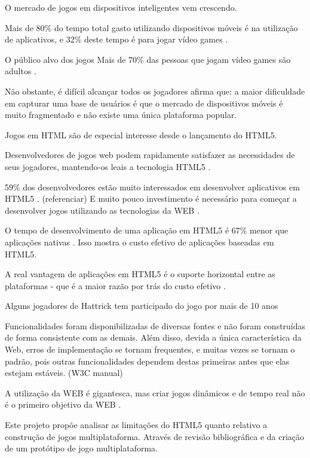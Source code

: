 
O mercado de jogos em dispositivos inteligentes vem crescendo.


Mais de 80\% do tempo total gasto utilizando dispositivos móveis é na
utilização de aplicativos, e 32\% deste tempo é para jogar vídeo
games \autocite{HTML5CrossPlatformGameDevelopment}.

O público alvo dos jogos 
Mais de 70\% das pessoas que jogam vídeo games são adultos
\autocite{gamebenefits}.

Não obstante, é difícil alcançar todos os jogadores
\cite{html5Tradeoffs} afirma que: a maior dificuldade em capturar uma
base de usuários é que o mercado de dispositivos móveis é muito
fragmentado e não existe uma única plataforma popular.

Jogos em HTML são de especial interesse desde o lançamento do HTML5.

Desenvolvedores de jogos web podem rapidamente satisfazer as
necessidades de seus jogadores, mantendo-os leais a tecnologia HTML5
\autocite{developingEffect}.

59\% dos desenvolvedores estão muito interessados em desenvolver 
aplicativos  em HTML5 \autocite{htmlSurvey}.
(referenciar) E muito pouco investimento é necessário para
começar a desenvolver jogos utilizando as tecnologias da WEB
\autocite{html5mostwanted}.

O tempo de desenvolvimento de uma aplicação em HTML5 é 67\% menor que
aplicações nativas \autocite[pp. 460]{html5Tradeoffs}. Isso mostra o
custo efetivo de aplicações baseadas em HTML5.

A real vantagem de aplicações em HTML5 é o suporte horizontal entre
as plataformas - que é a maior razão por trás do custo efetivo
\autocite{html5Tradeoffs}.

Alguns jogadores de Hattrick tem participado do jogo por mais de 
10 anos \autocite{gameCommunities}

Funcionalidades foram disponibilizadas de diversas fontes e não foram
construídas de forma consistente com as demais. Além disso,
devida a única característica da Web, erros de implementação se
tornam frequentes, e muitas vezes se tornam o padrão, pois outras
funcionalidades dependem destas primeiras antes que elas estejam
estáveis. (W3C manual)

A utilização da WEB é gigantesca, mas criar jogos
dinâmicos e de tempo real não é o primeiro objetivo da WEB
\autocite{html5mostwanted}.

Este projeto propõe analisar as limitações do HTML5 quanto relativo
a construção de jogos multiplataforma. Através de revisão
bibliográfica e da criação de um protótipo de jogo multiplataforma.


